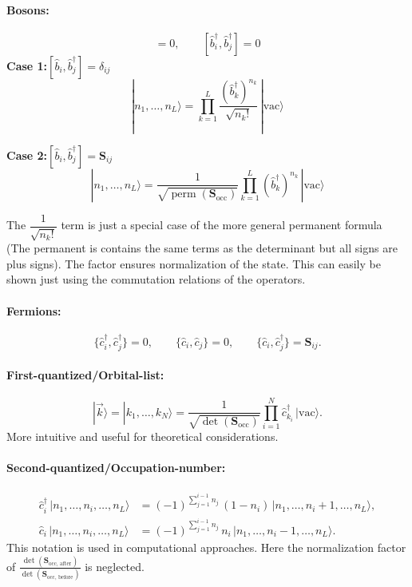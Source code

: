 \paragraph{Bosons:}
\begin{equation}
  [\hat b_i, \hat b_j] = 0, \qquad
  [\hat b^{\dagger}_i, \hat b^{\dagger}_j] = 0
\end{equation}
\textbf{Case 1:}\quad $[\hat b_i, \hat b_j^\dagger] = \delta_{ij}$
\begin{equation}
|n_1,\dots,n_L\rangle = \prod_{k=1}^L \frac{\left(\hat b_k^\dagger\right)^{n_k}}{\sqrt{n_k!}}\,|\mathrm{vac}\rangle
\end{equation}

\textbf{Case 2:}\quad $[\hat b_i, \hat b_j^\dagger] = \mathbf S_{ij}$
\begin{equation}
|n_1,\dots,n_L\rangle = \frac{1}{\sqrt{\operatorname{perm}(\mathbf S_{\mathrm{occ}})}}\prod_{k=1}^L \left(\hat b_k^\dagger\right)^{n_k}\,|\mathrm{vac}\rangle
\end{equation}

The $\dfrac{1}{\sqrt{n_k!}}$ term is just a special case of the more general 
permanent formula (The permanent is contains the same terms as the determinant but all signs are plus signs).  
The factor ensures normalization of the state. This can
easily be shown just using the commutation relations of the operators.

\paragraph{Fermions:}
\begin{equation}
  \{\hat c^{\dagger}_i, \hat c^{\dagger}_j\} = 0, \qquad
  \{\hat c_i, \hat c_j\} = 0, \qquad
  \{\hat c_i, \hat c^{\dagger}_j\} = \mathbf{S}_{ij}.
\end{equation}

\paragraph{First-quantized/Orbital-list:}
\begin{equation}
  |\vec k\rangle = |k_1, \dots, k_N\rangle
  = \frac{1}{\sqrt{\operatorname{det}(\mathbf S_{\mathrm{occ}})}}\prod_{i=1}^{N} \hat c^{\dagger}_{k_i}\,|\text{vac}\rangle.
\end{equation}
More intuitive and useful for theoretical considerations.

\paragraph{Second-quantized/Occupation-number:}
\begin{align}
  \hat c^{\dagger}_i\,|n_1, \dots, n_i, \dots, n_L\rangle
  &= (-1)^{\sum_{j=1}^{i-1} n_j}\,(1 - n_i)\,
     |n_1, \dots, n_i + 1, \dots, n_L\rangle, \\[4pt]
  \hat c_i\,|n_1, \dots, n_i, \dots, n_L\rangle
  &= (-1)^{\sum_{j=1}^{i-1} n_j}\,n_i\,
     |n_1, \dots, n_i - 1, \dots, n_L\rangle.
\end{align}
This notation is used in computational approaches. Here the normalization factor of $\frac{\det(\mathbf S_{\mathrm{occ,\,after}})}{\det(\mathbf S_{\mathrm{occ,\,before}})}$ is 
neglected.

